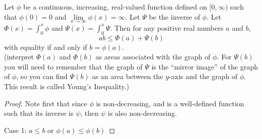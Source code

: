 \begin{pblm} \label{p:129} %
	Let $\phi$ be a continuous, increasing, real-valued function defined on $[0,\infty)$ 
	such that $\phi(0) = 0$ and $\lim\limits_{x\to\infty}\phi(x) = \infty$. Let 
	$\varPsi$ be the inverse of $\phi$. Let 
	$\Phi(x) = \int_0^x\phi$ and $\Psi(x) = \int_0^x\varPsi$. Then for any positive real 
	numbers $a$ and $b$, 
	\begin{equation*}
		ab \le \Phi(a) + \Psi(b)
	\end{equation*}
	with equality if and only if $b = \phi(a)$. \\
	{\scriptsize{(interpret $\Phi(a)$ and $\Phi(b)$ as areas associated with the graph of 
	$\phi$. For $\Psi(b)$ you will need to remember that the graph of $\varPsi$ is the 
	``mirror image'' of the graph of $\phi$, so you can find $\Psi(b)$ as an area between 
	the $y$-axis and the graph of $\phi$. This result is called Young's Inequality.)}}
\begin{proof}
	Note first that since $\phi$ is non-decreasing, and is a well-defined function such 
	that its inverse is $\psi$, then $\psi$ is also non-decreasing. 

	Case 1: $ a \le b$ or $\phi(a) \le \phi(b)$


\end{proof}
\end{pblm}
